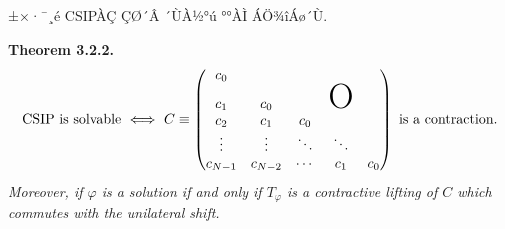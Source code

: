 \documentclass[12pt,a4paper,2sided]{article}
\begin{document}
±×·¯¸é CSIPÀÇ ÇØ´Â ´ÙÀ½°ú °°ÀÌ ÁÖ¾îÁø´Ù.

\newpage{}

\vspace{0.8cm}



{\bf Theorem 3.2.2.} {\rm \cite{FF}} {\sl
$$
\mbox{CSIP is solvable}\ \Longleftrightarrow\ C\equiv
\begin{pmatrix}
c_0\\
c_1&c_0&&\mbox{\rm{\Huge{O}}}\\
c_2&c_1&c_0\\
\vdots&\vdots&\ddots&\ddots\\
c_{N-1}&c_{N-2}&\cdots&c_1&c_0
\end{pmatrix}\ \mbox{is a contraction.}
$$
Moreover, if $\varphi$ is a solution if and only if  $T_\varphi$
is a contractive lifting of $C$ which commutes with the unilateral
shift.}
\end{document}
